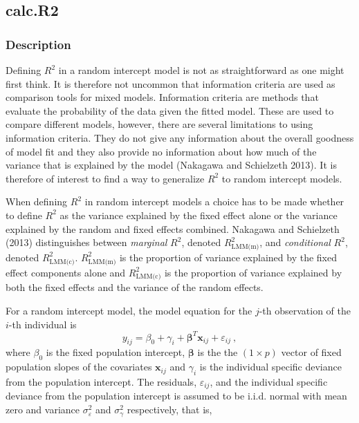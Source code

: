 \documentclass[
]{article}
\begin{document}
\hypertarget{calc.r2}{%
\subsection{calc.R2}\label{calc.r2}}

\hypertarget{description}{%
\subsubsection{Description}\label{description}}

Defining \(R^2\) in a random intercept model is not as straightforward
as one might first think. It is therefore not uncommon that information
criteria are used as comparison tools for mixed models. Information
criteria are methods that evaluate the probability of the data given the
fitted model. These are used to compare different models, however, there
are several limitations to using information criteria. They do not give
any information about the overall goodness of model fit and they also
provide no information about how much of the variance that is explained
by the model (Nakagawa and Schielzeth 2013). It is therefore of interest
to find a way to generalize \(R^2\) to random intercept models.

When defining \(R^2\) in random intercept models a choice has to be made
whether to define \(R^2\) as the variance explained by the fixed effect
alone or the variance explained by the random and fixed effects
combined. Nakagawa and Schielzeth (2013) distinguishes between
\textit{marginal} \(R^2\), denoted \(R^2_{\textrm{LMM(m)}}\), and
\textit{conditional} \(R^2\), denoted \(R^2_{\textrm{LMM(c)}}\).
\(R^2_{\textrm{LMM(m)}}\) is the proportion of variance explained by the
fixed effect components alone and \(R^2_{\textrm{LMM(c)}}\) is the
proportion of variance explained by both the fixed effects and the
variance of the random effects.

For a random intercept model, the model equation for the \(j\)-th
observation of the \(i\)-th individual is \begin{equation}
    y_{ij} = \beta_0 + \gamma_{i} + \boldsymbol{\beta}^T \boldsymbol{x}_{ij} + \varepsilon_{ij} \ ,
    \label{random_intercept_model}
\end{equation} where \(\beta_0\) is the fixed population intercept,
\(\boldsymbol{\beta}\) is the the \((1 \times p)\) vector of fixed
population slopes of the covariates \(\boldsymbol{x}_{ij}\) and
\(\gamma_{i}\) is the individual specific deviance from the population
intercept. The residuals, \(\varepsilon_{ij}\), and the individual
specific deviance from the population intercept is assumed to be i.i.d.
normal with mean zero and variance \(\sigma_\varepsilon^2\) and
\(\sigma_\gamma^2\) respectively, that is,
\end{document}
